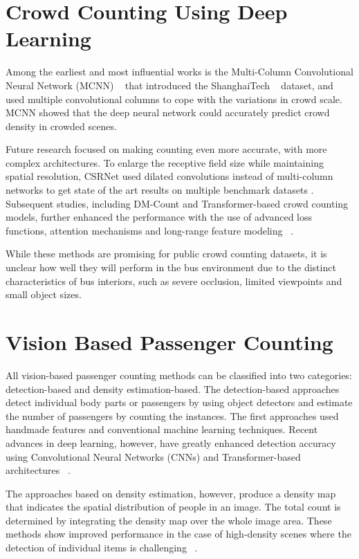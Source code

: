 
\section{Crowd Counting Using Deep Learning}

Among the earliest and most influential works is the Multi-Column Convolutional Neural Network (MCNN) ~\cite{Zhang2016} that introduced the ShanghaiTech ~\cite{Zhu2020} dataset, and used multiple convolutional columns to cope with the variations in crowd scale. MCNN showed that the deep neural network could accurately predict crowd density in crowded scenes.

Future research focused on making counting even more accurate, with more complex architectures. To enlarge the receptive field size while maintaining spatial resolution, CSRNet used dilated convolutions instead of multi-column networks to get state of the art results on multiple benchmark datasets \cite{li2018csrnet} . Subsequent studies, including DM-Count and Transformer-based crowd counting models, further enhanced the performance with the use of advanced loss functions, attention mechanisms and long-range feature modeling ~\cite{wang2020dmcount}.

While these methods are promising for public crowd counting datasets, it is unclear how well they will perform in the bus environment due to the distinct characteristics of bus interiors, such as severe occlusion, limited viewpoints and small object sizes.

\section{Vision Based Passenger Counting}

All vision-based passenger counting methods can be classified into two categories: detection-based and density estimation-based. The detection-based approaches detect individual body parts or passengers by using object detectors and estimate the number of passengers by counting the instances. The first approaches used handmade features and conventional machine learning techniques. Recent advances in deep learning, however, have greatly enhanced detection accuracy using Convolutional Neural Networks (CNNs) and Transformer-based architectures ~\cite{sindagi2018survey}.

The approaches based on density estimation, however, produce a density map that indicates the spatial distribution of people in an image. The total count is determined by integrating the density map over the whole image area. These methods show improved performance in the case of high-density scenes where the detection of individual items is challenging ~\cite{Zhang2016}.

